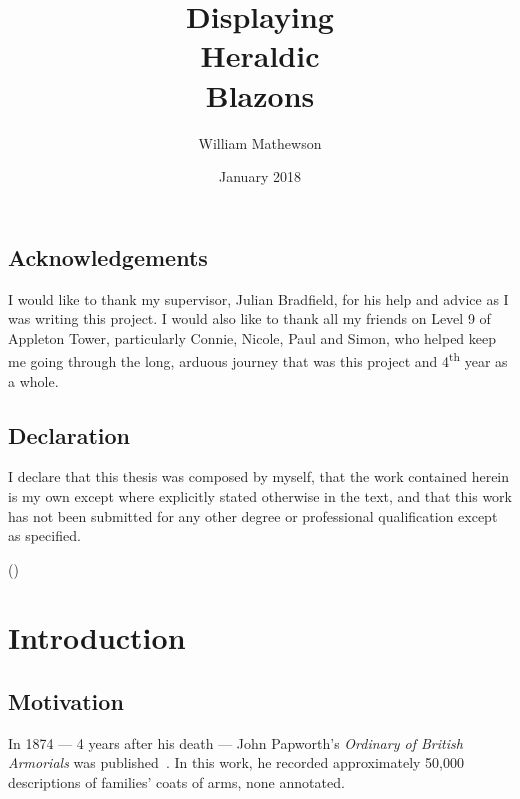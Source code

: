 \documentclass[nobib, a4paper, twoside, justified]{tufte-book}
\title{Displaying\\Heraldic\\Blazons}
\author{William Mathewson}
\date{January 2018}
\begin{document}
\frontmatter

\maketitlepage{}


\begin{publicationmeta}
  \section*{Acknowledgements}
  I would like to thank my supervisor, Julian Bradfield, for his help and advice as I was writing
  this project. I would also like to thank all my friends on Level 9 of Appleton Tower,
  particularly Connie, Nicole, Paul and Simon, who helped keep me going through the long, arduous
  journey that was this project and 4\textsuperscript{th} year as a whole.

  \section*{Declaration}
  I declare that this thesis was composed by myself,
  that the work contained herein is my own
  except where explicitly stated otherwise in the text,
  and that this work has not been submitted for any other degree or
  professional qualification except as specified.\par
  ({\textit{\thanklessauthor}})
\end{publicationmeta}

\tableofcontents


\mainmatter%

\chapter{Introduction}%
\label{cha:introduction}

\section{Motivation}\label{sec:motivation}

In 1874 --- 4 years after his death --- John Papworth's \textit{Ordinary of British Armorials} was
published~\autocite{collins_1942}. In this work, he recorded approximately 50,000 descriptions of
families' coats of arms, none annotated.
\end{document}
